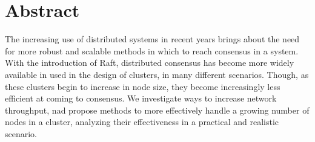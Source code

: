 \section*{Abstract}

\fontsize{10pt}{12pt}\selectfont
The increasing use of distributed systems in recent years brings about the need for more robust and scalable methods in which to reach consensus in a system. With the introduction of Raft, distributed consensus has become more widely available in used in the design of clusters, in many different scenarios. Though, as these clusters begin to increase in node size, they become increasingly less efficient at coming to consensus. We investigate ways to increase network throughput, nad propose methods to more effectively handle a growing number of nodes in a cluster, analyzing their effectiveness in a practical and realistic scenario.